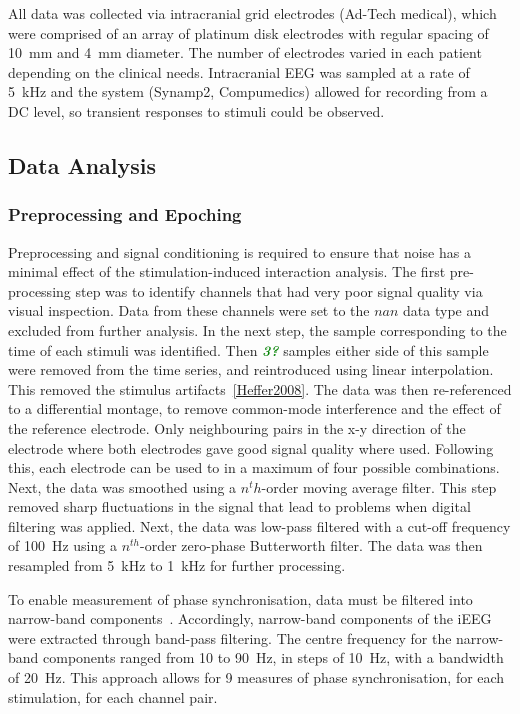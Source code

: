 \documentclass[]{article}
\newcommand{\dean}[1]{\textsf{\emph{\textbf{\textcolor{green}{#1}}}}}
\begin{document}
All data was collected via intracranial grid electrodes (Ad-Tech medical), which were comprised of an array of platinum disk electrodes with regular spacing of 10~mm and 4~mm diameter. The number of electrodes varied in each patient depending on the clinical needs. Intracranial EEG was sampled at a rate of 5~kHz and the system (Synamp2, Compumedics) allowed for recording from a DC level, so transient responses to stimuli could be observed.

\subsection{Data Analysis}
\subsubsection{Preprocessing and Epoching}
Preprocessing and signal conditioning is required to ensure that noise has a minimal effect of the stimulation-induced interaction analysis. The first pre-processing step was to identify channels that had very poor signal quality via visual inspection. Data from these channels were set to the $nan$ data type and excluded from further analysis. In the next step, the sample corresponding to the time of each stimuli was identified. Then \dean{3?} samples either side of this sample were removed from the time series, and reintroduced using linear interpolation. This removed the stimulus artifacts~\ref{Heffer2008}. The data was then re-referenced to a differential montage, to remove common-mode interference and the effect of the reference electrode. Only neighbouring pairs in the x-y direction of the electrode where both electrodes gave good signal quality where used. Following this, each electrode can be used to in a maximum of four possible combinations. Next, the data was smoothed using a $n^th$-order moving average filter. This step removed sharp fluctuations in the signal that lead to problems when digital filtering was applied. Next, the data was low-pass filtered with a cut-off frequency of 100~Hz using a $n^{th}$-order zero-phase Butterworth filter. The data was then resampled from 5~kHz to 1~kHz for further processing.

To enable measurement of phase synchronisation, data must be filtered into narrow-band components~\cite{Rosenblum2004}. Accordingly, narrow-band components of the iEEG were extracted through band-pass filtering. The centre frequency for the narrow-band components ranged from 10 to 90~Hz, in steps of 10~Hz, with a bandwidth of 20~Hz. This approach allows for 9 measures of phase synchronisation, for each stimulation, for each channel pair.
\end{document}
